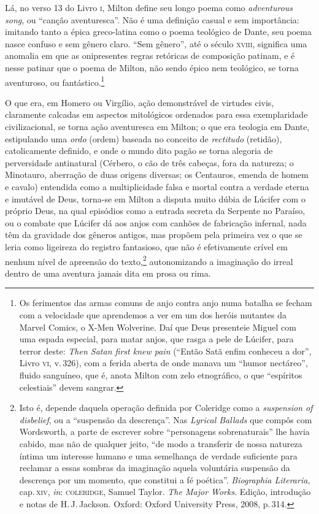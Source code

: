 Lá, no verso 13 do Livro \textsc{i}, Milton define seu longo poema como
\emph{adventurous song}, ou ``canção aventuresca''. Não é uma definição
casual e sem importância: imitando tanto a épica greco-latina como o
poema teológico de Dante, seu poema nasce confuso e sem gênero claro.
``Sem gênero'', até o século \textsc{xviii}, significa uma anomalia em que as
onipresentes regras retóricas de composição patinam, e é nesse patinar
que o poema de Milton, não sendo épico nem teológico, se torna
aventuroso, ou fantástico.\footnote{Os ferimentos das armas comuns de
  anjo contra anjo numa batalha se fecham com a velocidade que
  aprendemos a ver em um dos heróis mutantes da Marvel Comics, o
  X-Men Wolverine. Daí que Deus presenteie Miguel com uma espada
  especial, para matar anjos, que rasga a pele de Lúcifer, para terror
  deste: \emph{Then Satan first knew pain} (``Então Satã enfim conheceu
  a dor'', Livro \textsc{vi}, v.\,326), com a ferida aberta de onde manava um
  ``humor nectáreo'', fluido sanguíneo, que é, anota Milton com zelo
  etnográfico, o que ``espíritos celestiais'' devem sangrar.}

O que era, em Homero ou Virgílio, ação demonstrável de virtudes civis,
claramente calcadas em aspectos mitológicos ordenados para essa
exemplaridade civilizacional, se torna ação aventuresca em Milton; o que
era teologia em Dante, estipulando uma \emph{ordo} (ordem) baseada no
conceito de \emph{rectitudo} (retidão), catolicamente definido, e onde o
mundo dito pagão se torna alegoria de perversidade antinatural (Cérbero,
o cão de três cabeças, fora da natureza; o Minotauro, aberração de duas
origens diversas; os Centauros, emenda de homem e cavalo) entendida como
a multiplicidade falsa e mortal contra a verdade eterna e imutável de
Deus, torna-se em Milton a disputa muito dúbia de Lúcifer com o próprio
Deus, na qual episódios como a entrada secreta da Serpente no Paraíso,
ou o combate que Lúcifer dá aos anjos com canhões de fabricação
infernal, nada têm da gravidade dos gêneros antigos, mas propõem pela
primeira vez o que se leria como ligeireza do registro fantasioso, que
não é efetivamente crível em nenhum nível de apreensão do
texto,\footnote{Isto é, depende daquela operação definida por Coleridge
  como a \emph{suspension of disbelief}, ou a ``suspensão da
  descrença''. Nas \emph{Lyrical Ballads} que compôs com Wordsworth, a
  parte de escrever sobre ``personagens sobrenaturais'' lhe havia
  cabido, mas não de qualquer jeito, ``de modo a transferir de nossa
  natureza íntima um interesse humano e uma semelhança de verdade
  suficiente para reclamar a essas sombras da imaginação aquela
  voluntária suspensão da descrença por um momento, que constitui a fé
  poética''. \emph{Biographia Literaria}, cap.\,\textsc{xiv}, \emph{in}:
  \textsc{coleridge}, Samuel Taylor. \emph{The Major Works}. Edição, introdução e notas de H.\,J.\,Jackson. Oxford: Oxford University
  Press, 2008, p.\,314.} autonomizando a imaginação do irreal dentro de
uma aventura jamais dita em prosa ou rima.


